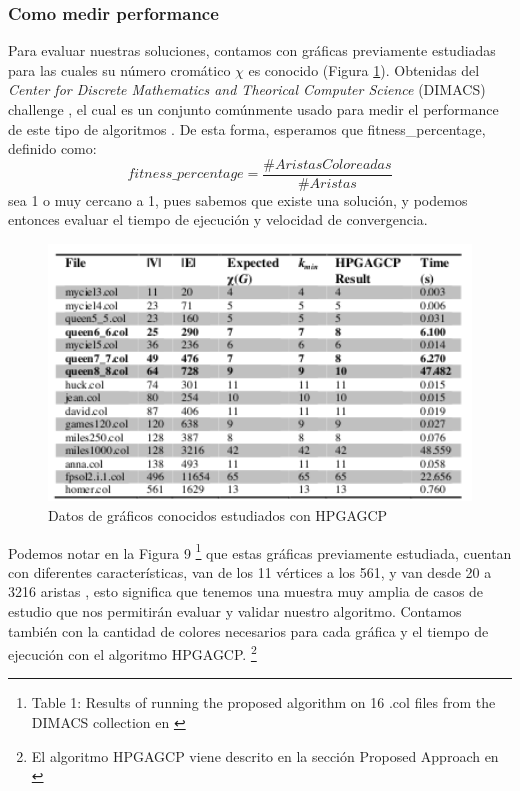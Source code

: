\documentclass{article}
\begin{document}
\subsubsection{Como medir performance}
Para evaluar nuestras soluciones, contamos con gráficas previamente estudiadas para las cuales su número cromático $\chi$ es conocido (Figura \ref{table:dimacs_graphs}). Obtenidas del \textit{Center for Discrete Mathematics and Theorical Computer Science} (DIMACS) challenge \cite{Graph colors instance}, el cual es un conjunto comúnmente usado para medir el performance de este tipo de algoritmos .
De esta forma, esperamos que fitness\_percentage, definido como:
\begin{equation*}
    fitness\_percentage = \frac{\#AristasColoreadas}{\#Aristas}
\end{equation*}
sea 1 o muy cercano a 1, pues sabemos que existe una solución, y podemos entonces evaluar el tiempo de ejecución y velocidad de convergencia. 
\begin{figure}[H]
    \centering
    \includegraphics[width=13cm]{imgs/datos.png}
    \caption{Datos de gráficos conocidos estudiados con HPGAGCP}
    \label{table:dimacs_graphs}
\end{figure}
Podemos notar en la Figura 9 \footnote{ Table 1: Results of running the proposed algorithm on 16 .col
files from the DIMACS collection en \cite{M. Hindi and V.Yampolskiy, 2011}} que estas gráficas previamente estudiada, cuentan con diferentes características, van de los 11 vértices a los 561, y van desde 20  a  3216 aristas , esto significa que tenemos una muestra muy amplia de casos de estudio que nos permitirán evaluar y validar nuestro algoritmo. Contamos también con la cantidad de colores necesarios para cada gráfica y el tiempo de ejecución con el algoritmo HPGAGCP. \footnote{El algoritmo HPGAGCP viene descrito en la sección Proposed Approach en \cite{M. Hindi and V.Yampolskiy, 2011}}
\end{document}
